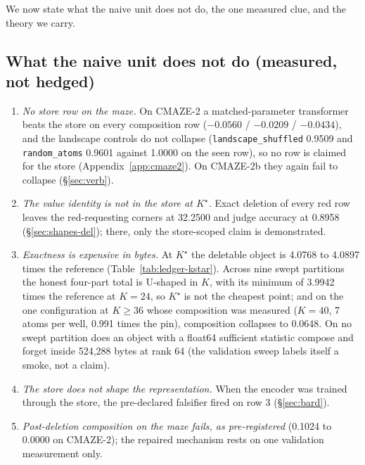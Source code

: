\documentclass{article} %
\newcommand{\Kstar}{\ensuremath{K^{\star}}}
\begin{document}
We now state what the naive unit does not do, the one measured clue, and the theory we carry.
\subsection{What the naive unit does not do (measured, not hedged)}
\label{sec:limits-list}

\begin{enumerate}[leftmargin=*,itemsep=1pt]
\item \emph{No store row on the maze.} On CMAZE-2 a matched-parameter transformer beats the
  store on every composition row ($-0.0560$ / $-0.0209$ / $-0.0434$), and the landscape controls do
  not collapse (\texttt{landscape\_shuffled} 0.9509 and \texttt{random\_atoms} 0.9601 against
  1.0000 on the seen row), so no row is claimed for the store (Appendix~\ref{app:cmaze2}). On CMAZE-2b they again fail to collapse (\S\ref{sec:verb}). %
\item \emph{The value identity is not in the store at $\Kstar$.} Exact deletion of every red
  row leaves the red-requesting corners at 32.2500 and judge accuracy at 0.8958
  (\S\ref{sec:shapes-del}); there, only the store-scoped claim is demonstrated.
\item \emph{Exactness is expensive in bytes.} At $\Kstar$ the deletable object is 4.0768 to 4.0897
  times the reference (Table~\ref{tab:ledger-kstar}). Across nine swept partitions the honest
  four-part total is U-shaped in $K$, with its minimum of 3.9942 times the reference at $K=24$, so
  $\Kstar$ is not the cheapest point; and on the one configuration at $K\ge36$ whose composition
  was measured ($K=40$, 7 atoms per well, 0.991 times the pin), composition collapses to 0.0648.
  On no swept partition does an object with a float64 sufficient statistic compose and forget inside 524,288 bytes at rank
  64 (the validation sweep labels itself a smoke, not a claim).
\item \emph{The store does not shape the representation.} When the encoder was trained through
  the store, the pre-declared falsifier fired on row 3 (\S\ref{sec:bard}). %
\item \emph{Post-deletion composition on the maze fails, as pre-registered} (0.1024 to 0.0000
  on CMAZE-2); the repaired mechanism rests on one validation measurement only.

\end{enumerate}
\end{document}
